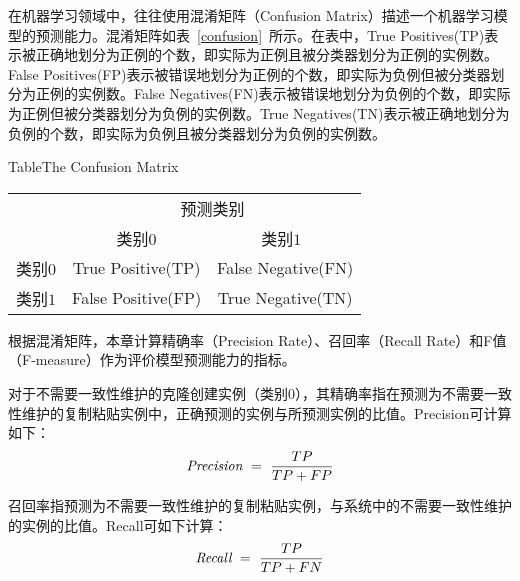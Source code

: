 在机器学习领域中，往往使用混淆矩阵（Confusion Matrix）描述一个机器学习模型的预测能力。混淆矩阵如表~\ref{confusion}~所示。在表中，True Positives(TP)表示被正确地划分为正例的个数，即实际为正例且被分类器划分为正例的实例数。False Positives(FP)表示被错误地划分为正例的个数，即实际为负例但被分类器划分为正例的实例数。False Negatives(FN)表示被错误地划分为负例的个数，即实际为正例但被分类器划分为负例的实例数。True Negatives(TN)表示被正确地划分为负例的个数，即实际为负例且被分类器划分为负例的实例数。　　​

\begin{table}[htbp]
{Table$\!$}{The Confusion Matrix}
\vspace{0.5em}
\centering
\wuhao
\begin{tabular}{ccc}
\toprule[1.5pt]
~\multirow{2}{*}{真实类别}& \multicolumn{2}{c}{预测类别} ~\\ 
 \cline{2-3}
~&{类别$0$} &{类别$1$}~\\
\midrule[1pt]
类别$0$&True Positive(TP)	&False Negative(FN)\\
类别$1$&False Positive(FP)	&True Negative(TN)\\
\bottomrule[1.5pt]
\end{tabular}
\end{table}

根据混淆矩阵，本章计算精确率（Precision Rate）、召回率（Recall Rate）和F值（F-measure）作为评价模型预测能力的指标。

对于不需要一致性维护的克隆创建实例（类别$0$），其精确率指在预测为不需要一致性维护的复制粘贴实例中，正确预测的实例与所预测实例的比值。Precision可计算如下：
\begin{equation} 
\mbox{\it Precision}~=~{\frac {TP}{TP+FP}}
 \end{equation}
 
召回率指预测为不需要一致性维护的复制粘贴实例，与系统中的不需要一致性维护的实例的比值。Recall可如下计算：
\begin{equation} 
\mbox{\it Recall}~=~{\frac {TP}{TP+FN}}
 \end{equation}


